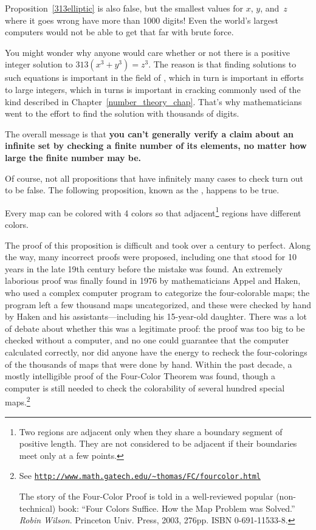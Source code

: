 Proposition~\ref{313elliptic} is also false, but the smallest values
for $x$, $y$, and~$z$ where it goes wrong have more than 1000 digits!
Even the world's largest computers would not be able to get that far
with brute force.

You might wonder why anyone would care whether or not there is a
positive integer solution to $313 (x^3 + y^3) = z^3$.  The reason is
that finding solutions to such equations is important in the field of
, which in turn is important in efforts to
 large integers, which in turns is important in cracking
commonly used  of the kind described in
Chapter~\ref{number_theory_chap}.  That's why mathematicians went to
the effort to find the solution with thousands of digits.

The overall message is that \textbf{you can't generally verify a claim
  about an infinite set by checking a finite number of its elements,
  no matter how large the finite number may be.}

Of course, not all propositions that have infinitely many cases to
check turn out to be false.  The following proposition, known as the
, happens to be true.
\begin{proposition}\label{4colorprop}
Every map can be colored with 4 colors so that adjacent\footnote{Two
  regions are adjacent only when they share a boundary segment of
  positive length.  They are not considered to be adjacent if their
  boundaries meet only at a few points.} regions have different
colors.
\end{proposition}
The proof of this proposition is difficult and took over a century to
perfect.  Along the way, many incorrect proofs were proposed,
including one that stood for 10 years in the late 19th century before
the mistake was found.  An extremely laborious proof was finally found
in 1976 by mathematicians Appel and Haken, who used a complex computer
program to categorize the four-colorable maps; the program left a few
thousand maps uncategorized, and these were checked by hand by Haken
and his assistants---including his 15-year-old daughter.  There was a
lot of debate about whether this was a legitimate proof: the proof was
too big to be checked without a computer, and no one could guarantee
that the computer calculated correctly, nor did anyone have the energy
to recheck the four-colorings of the thousands of maps that were done by
hand.  Within the past decade, a mostly intelligible proof of the
Four-Color Theorem was found, though a computer is still needed to
check the colorability of several hundred special maps.\footnote{See
\href{http://www.math.gatech.edu/~thomas/FC/fourcolor.html}
{\texttt{http://www.math.gatech.edu/\~{}thomas/FC/fourcolor.html}}

The story of the Four-Color Proof is told in a well-reviewed
  popular (non-technical) book: ``Four Colors Suffice.  How the Map
  Problem was Solved.'' \emph{Robin Wilson}.  Princeton Univ. Press, 2003,
  276pp. ISBN 0-691-11533-8.}

